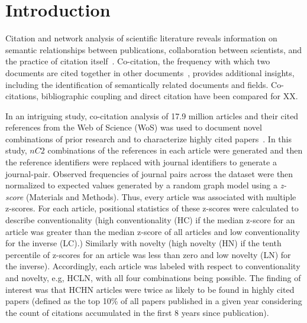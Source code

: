 \documentclass[NETN]{stjour}
\begin{document}


\section{Introduction}
Citation and network analysis of  scientific literature reveals information on semantic relationships between publications, collaboration between scientists, and the practice of citation itself~\citep{de_solla_price_networks_1965,newman_structure_2001,Shi:2010:CHI:1816123.1816131,patience_pmid28560354}. Co-citation, the frequency with which two documents are cited together in other documents~\citep{small_co-citation_1973,marshakova-shaikevich_co-citation_1973}, provides additional insights, including the identification of semantically related documents and fields. Co-citations, bibliographic coupling and direct citation have been compared for XX.

In an intriguing study, co-citation analysis of 17.9 million articles and their cited references from the Web of Science (WoS) was used to document novel combinations of prior research and to characterize highly cited papers~\citep{uzzi_atypical_2013}. In this study, $nC2$ combinations of the references in each article were generated and then the reference identifiers were replaced with journal identifiers to generate a journal-pair. Observed frequencies of journal pairs across the dataset were then normalized to expected values generated by a random graph model using a \emph{z-score} (Materials and Methods). Thus, every article was associated with multiple z-scores. For each article, positional statistics of these z-scores were calculated to describe conventionality (high conventionality (HC) if the median z-score for an article was greater than the median z-score of all articles and low conventionality for the inverse (LC).) Similarly with novelty (high novelty (HN) if the tenth percentile of z-scores for an article was less than zero and low novelty (LN) for the inverse). Accordingly, each article was labeled with respect to conventionality and novelty, e.g, HCLN, with all four combinations being possible. The finding of interest was that HCHN articles were twice as likely to be found in highly cited papers (defined as the top 10\% of all papers published in a given year considering the count of citations accumulated in the first 8 years since publication). 
\end{document}
